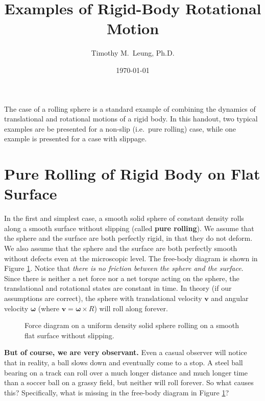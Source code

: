 \documentclass{../../../oss-handout}
\title{Examples of Rigid-Body Rotational Motion}
\author{Timothy M.\ Leung, Ph.D.}
\date{\today}
\begin{document}
\thispagestyle{title}
\gentitle

The case of a rolling sphere is a standard example of combining the dynamics of
translational and rotational motions of a rigid body. In this handout, two
typical examples are be presented for a non-slip (i.e.\ pure rolling) case,
while one example is presented for a case with slippage.

\section{Pure Rolling of Rigid Body on Flat Surface}
\label{no-slip-ball}
In the first and simplest case, a smooth solid sphere of constant density rolls
along a smooth surface without slipping (called \textbf{pure rolling}). We
assume that the sphere and the surface are both perfectly rigid, in that they
do not deform. We also assume that the sphere and the surface are both
perfectly smooth without defects even at the microscopic level. The free-body
diagram is shown in Figure \ref{roll-flat}. Notice that
\emph{there is no friction between the sphere and the surface}. Since there is
neither a net force nor a net torque acting on the sphere, the translational
and rotational states are constant in time. In theory (if our assumptions are
correct), the sphere with translational velocity $\bm{v}$ and angular velocity
$\bm\omega$ (where $\bm{v}=\bm{\omega}\times R$) will roll along forever.
\begin{figure}[!ht]
  \centering
  \caption{Force diagram on a uniform density solid sphere rolling on a smooth
    flat surface without slipping.}
  \label{roll-flat}
\end{figure}

\textbf{But of course, we are very observant.} Even a casual observer will
notice that in reality, a ball slows down and eventually come to a stop. A
steel ball bearing on a track can roll over a much longer distance and
much longer time than a soccer ball on a grassy field, but neither will roll
forever. So what causes this? Specifically, what is missing in the free-body
diagram in Figure \ref{roll-flat}?
\end{document}
